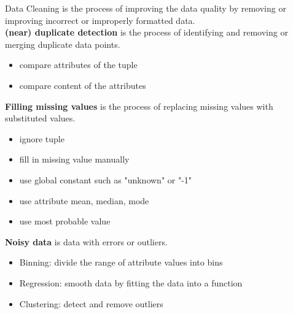 \begin{definition}{Data Cleaning}
    is the process of improving the data quality by removing or improving incorrect or improperly formatted data.
    \vspace{1mm}\\
    \textbf{(near) duplicate detection} is the process of identifying and removing or merging duplicate data points.
    \begin{itemize}
        \item compare attributes of the tuple
        \item compare content of the attributes
    \end{itemize}
    \vspace{1mm}
    \textbf{Filling missing values} is the process of replacing missing values with substituted values.
    \begin{itemize}
        \item ignore tuple
        \item fill in missing value manually
        \item use global constant such as "unknown" or "-1"
        \item use attribute mean, median, mode
        \item use most probable value
    \end{itemize}
    \vspace{1mm}
    \textbf{Noisy data} is data with errors or outliers.
    \begin{itemize}
        \item Binning: divide the range of attribute values into bins
        \item Regression: smooth data by fitting the data into a function
        \item Clustering: detect and remove outliers
    \end{itemize}
\end{definition}



